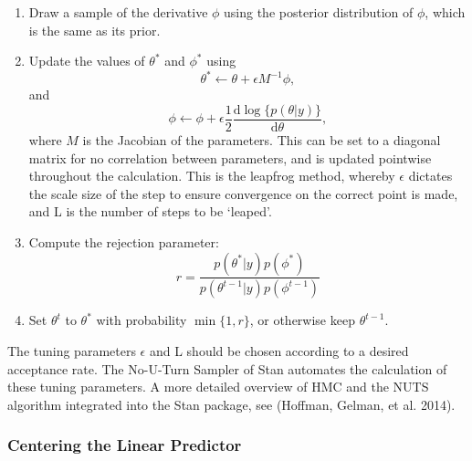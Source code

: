 \documentclass[
]{article}
\begin{document}
\begin{enumerate}
\item Draw a sample of the derivative $\phi$ using the posterior distribution of $\phi$, which is the same as its prior.
\item Update the values of $\theta^*$ and $\phi^*$ using
  \begin{equation}
    \theta^*\leftarrow \theta+\epsilon M^{-1}\phi,
  \end{equation}
  and
  \begin{equation}
    \phi\leftarrow \phi+\epsilon\frac{1}{2}\frac{\mathrm{d}\log\{p(\theta|y)\}}{\mathrm{d}\theta},
  \end{equation}
where $M$ is the Jacobian of the parameters. This can be set to a diagonal matrix for no correlation between parameters, and is updated pointwise throughout the calculation. This is the leapfrog method, whereby $\epsilon$ dictates the scale size of the step to ensure convergence on the correct point is made, and L is the number of steps to be `leaped'.
\item Compute the rejection parameter:
  \begin{equation}
    r=\frac{p(\theta^*|y)p(\phi^*)}{p(\theta^{t-1}|y)p(\phi^{t-1})}
  \end{equation}
\item Set $\theta^t$ to $\theta^*$ with probability $\min\{1,r\}$, or otherwise keep $\theta^{t-1}$.
\end{enumerate}

The tuning parameters \(\epsilon\) and L should be chosen according to a desired acceptance rate. The No-U-Turn Sampler of Stan automates the calculation of these tuning parameters. A more detailed overview of HMC and the NUTS algorithm integrated into the Stan package, see (Hoffman, Gelman, et al. 2014).

\subsubsection{Centering the Linear Predictor}\label{centering-the-linear-predictor}
\end{document}
